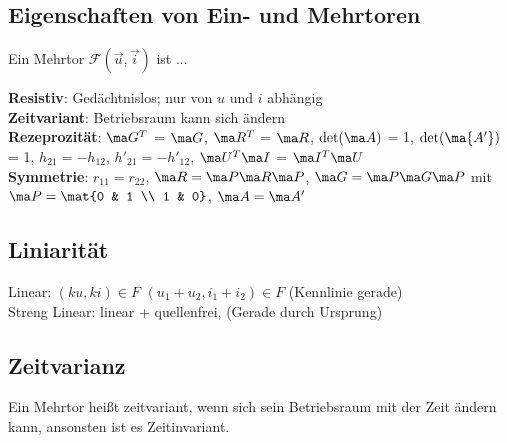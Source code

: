 \documentclass[fs, footer]{latex4ei}
\begin{document}
\begin{multicols*}{4}
\section{Eigenschaften von Ein- und Mehrtoren}
Ein Mehrtor $\mathcal F(\vec u, \vec i)$ ist ...

	\textbf{Resistiv}: Gedächtnislos; nur von $u$ und $i$ abhängig\\
	\textbf{Zeitvariant}: Betriebsraum kann sich ändern\\
	\textbf{Rezeprozität}: $\ma G^T$ = $\ma G$, $\ma R^T$ = $\ma R$, $\det (\ma A)$ = 1, $\det (\ma {A'})$ = 1, $h_{21} = -h_{12}$, $h'_{21} = -h'_{12}$, $\ma U^T\ma I$ = $\ma I^T\ma U$\\
	\textbf{Symmetrie}: $r_{11} = r_{22}$, $\ma R = \ma P\ma R\ma P$, $\ma G = \ma P \ma G \ma P$ mit $\ma P = \mat{0 & 1 \\ 1 & 0}$, $\ma A = \ma A'$


	\subsection{Liniarität}
	Linear: $(ku, ki) \in F$ \quad $(u_1 + u_2, i_1 + i_2) \in F$ (Kennlinie gerade) \\
	Streng Linear: linear + quellenfrei, (Gerade durch Ursprung)\\

	\subsection{Zeitvarianz}
	Ein Mehrtor heißt zeitvariant, wenn sich sein Betriebsraum mit der Zeit ändern kann, ansonsten
	ist es Zeitinvariant.


\end{multicols*}
\end{document}
